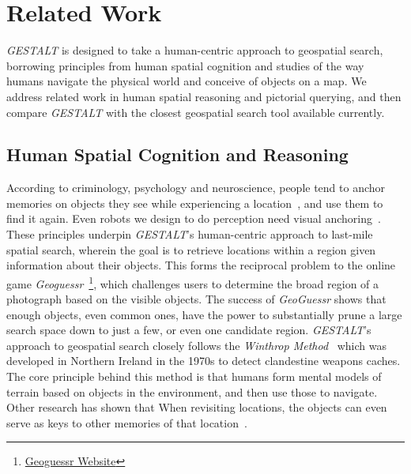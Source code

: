 \section{Related Work}
\label{section:related}

\emph{GESTALT} is designed to take a human-centric approach to geospatial search, borrowing principles from human spatial cognition and studies of the way humans navigate the physical world and conceive of objects on a map.
We address related work in human spatial reasoning and pictorial querying, and then compare \emph{GESTALT} with the closest geospatial search tool available currently.

\subsection{Human Spatial Cognition and Reasoning}
According to criminology, psychology and neuroscience, people tend to anchor memories on objects they see while experiencing a location~\cite{Helbing2020}, and use them to find it again. 
Even robots we design to do perception need visual anchoring~\cite{Oliveira2016}.
These principles underpin \emph{GESTALT}'s human-centric approach to last-mile spatial search, wherein the goal is to retrieve locations within a region given information about their objects.
This forms the reciprocal problem to the online game \textit{Geoguessr}~\footnote{\href{https://www.geoguessr.com/}{Geoguessr Website}}, which challenges users to determine the broad region of a photograph based on the visible objects.
The success of \textit{GeoGuessr} shows that enough objects, even common ones, have the power to substantially prune a large search space down to just a few, or even one candidate region.
\emph{GESTALT}'s approach to geospatial search closely follows the \textit{Winthrop Method}~\cite{Keatley2021} which was developed in Northern Ireland in the 1970s to detect clandestine weapons caches.
The core principle behind this method is that humans form mental models of terrain based on objects in the environment, and then use those to navigate.
Other research has shown that When revisiting locations, the objects can even serve as keys to other memories of that location~\cite{Miller2013}.


